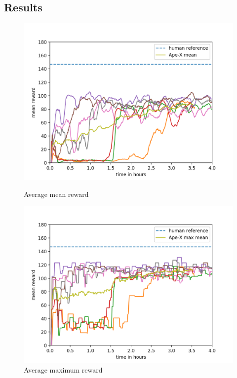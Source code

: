 \documentclass[12pt,a4paper]{article}
\begin{document}
\subsection{Results}\label{sec:results}
\begin{figure}
    \centering
    \begin{minipage}{.5\textwidth}
      \centering
      \includegraphics[width=1\linewidth]{Figures/results_mean.png}
      \caption{Average mean reward}
      \label{fig:results_mean}
    \end{minipage}%
    \begin{minipage}{.5\textwidth}
      \centering
      \includegraphics[width=1\linewidth]{Figures/results_max.png}
      \caption{Average maximum reward}
      \label{fig:results_max}
    \end{minipage}
\end{figure}
\end{document}
